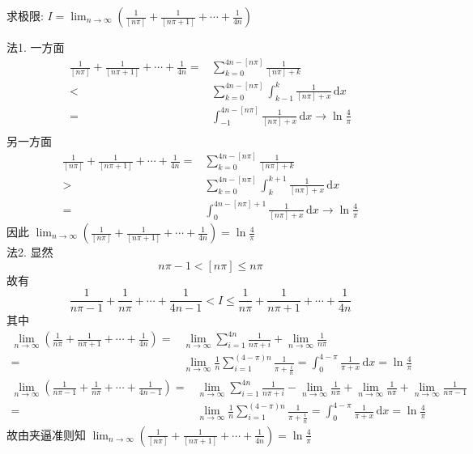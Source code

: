 \documentclass[color=green,titlestyle=hang]{elegantbook}%
\begin{document}
\begin{exercise}
求极限: $I=\lim_{n\to\infty}\left(\frac{1}{[n\pi]}+\frac{1}{[n\pi+1]}+\cdots+\frac{1}{4n}\right)$
\end{exercise}\begin{solution}法1. 一方面
\begin{align*}
\frac{1}{[n\pi]}+\frac{1}{[n\pi+1]}+\cdots+\frac{1}{4n}
=&\sum_{k=0}^{4n-[n\pi]}\frac{1}{[n\pi]+k}\\
<&\sum_{k=0}^{4n-[n\pi]}\int_{k-1}^{k}\frac{1}{[n\pi]+x}\,\mathrm{d}x\\
=&\int_{-1}^{4n-[n\pi]}\frac{1}{[n\pi]+x}\,\mathrm{d}x\to\ln\frac{4}{\pi}\\[-12mm]
\end{align*}
另一方面\begin{align*}
\frac{1}{[n\pi]}+\frac{1}{[n\pi+1]}+\cdots+\frac{1}{4n}
=&\sum_{k=0}^{4n-[n\pi]}\frac{1}{[n\pi]+k}\\
>&\sum_{k=0}^{4n-[n\pi]}\int_{k}^{k+1}\frac{1}{[n\pi]+x}\,\mathrm{d}x\\
=&\int_0^{4n-[n\pi]+1}\frac{1}{[n\pi]+x}\,\mathrm{d}x\to\ln\frac{4}{\pi}
\end{align*}
因此 $\lim_{n\to\infty}\left(\frac{1}{[n\pi]}+\frac{1}{[n\pi+1]}+\cdots+\frac{1}{4n}\right)=\ln\frac{4}{\pi}$\\
法2. 显然\[n\pi-1<[n\pi]\leqslant n\pi\]
故有\[\frac{1}{n\pi-1}+\frac{1}{n\pi}+\cdots+\frac{1}{4n-1}< I\leqslant\frac{1}{n\pi}+\frac{1}{n\pi+1}+\cdots+\frac{1}{4n}\]
其中
\begin{align*}
\lim_{n\to\infty}\left(\frac{1}{n\pi}+\frac{1}{n\pi+1}+\cdots+\frac{1}{4n}\right)
=&\lim_{n\to\infty}\sum_{i=1}^{4n}\frac{1}{n\pi+i}+\lim_{n\to\infty}\frac{1}{n\pi}\\
=&\lim_{n\to\infty}\frac{1}{n}\sum_{i=1}^{(4-\pi)n}\frac{1}{\pi+\frac{i}{n}}=\int_0^{4-\pi}\frac{1}{\pi+x}\,\mathrm{d}x=\ln\frac{4}{\pi}
\end{align*}
\begin{align*}
\lim_{n\to\infty}\left(\frac{1}{n\pi-1}+\frac{1}{n\pi}+\cdots+\frac{1}{4n-1}\right)
=&\lim_{n\to\infty}\sum_{i=1}^{4n}\frac{1}{n\pi+i}-\lim_{n\to\infty}\frac{1}{n\pi}+\lim_{n\to\infty}\frac{1}{n\pi}+\lim_{n\to\infty}\frac{1}{n\pi-1}\\
=&\lim_{n\to\infty}\frac{1}{n}\sum_{i=1}^{(4-\pi)n}\frac{1}{\pi+\frac{i}{n}}=\int_0^{4-\pi}\frac{1}{\pi+x}\,\mathrm{d}x=\ln\frac{4}{\pi}
\end{align*}
故由夹逼准则知 $\lim_{n\to\infty}\left(\frac{1}{[n\pi]}+\frac{1}{[n\pi+1]}+\cdots+\frac{1}{4n}\right)=\ln\frac{4}{\pi}$
\end{solution}
\end{document}
